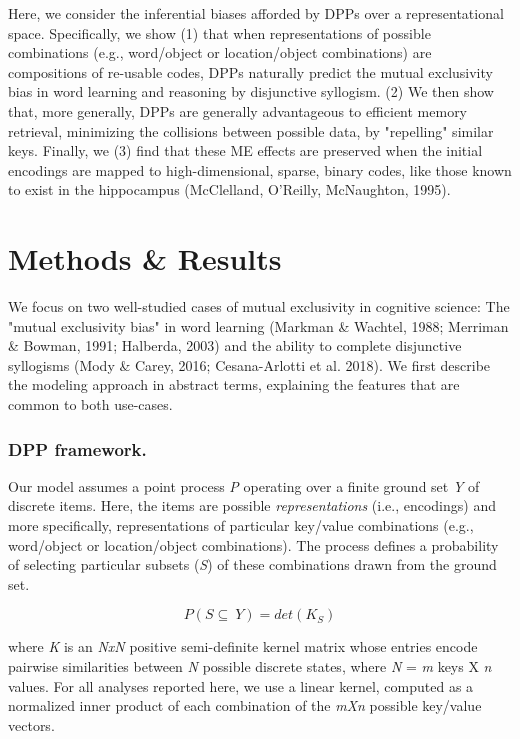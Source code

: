 \documentclass[10pt,letterpaper]{article}
\begin{document}
Here, we consider the inferential biases afforded by DPPs over a representational space. Specifically, we show (1) that when representations of possible combinations (e.g., word/object or location/object combinations) are compositions of re-usable codes, DPPs naturally predict the mutual exclusivity bias in word learning and reasoning by disjunctive syllogism. (2) We then show that, more generally, DPPs are generally advantageous to efficient memory retrieval, minimizing the collisions between possible data, by "repelling" similar keys. Finally, we (3) find that these ME effects are preserved when the initial encodings are mapped to high-dimensional, sparse, binary codes, like those known to exist in the hippocampus (McClelland, O'Reilly, McNaughton, 1995).

\section{Methods & Results}

We focus on two well-studied cases of mutual exclusivity in cognitive science: The "mutual exclusivity bias" in word learning (Markman & Wachtel, 1988; Merriman & Bowman, 1991; Halberda, 2003) and the ability to complete disjunctive syllogisms (Mody \& Carey, 2016; Cesana-Arlotti et al. 2018). We first describe the modeling approach in abstract terms, explaining the features that are common to both use-cases.

\subsubsection{DPP framework.}
Our model assumes a point process \textit{P} operating over a finite ground set \textit{Y} of discrete items. Here, the items are possible \textit{representations} (i.e., encodings) and more specifically, representations of particular key/value combinations (e.g., word/object or location/object combinations). The process defines a probability of selecting particular subsets (\textit{S}) of these combinations drawn from the ground set.

\[P (S \subseteq\ Y) = det (K _{S})\]

where \textit{K} is an \textit{NxN} positive semi-definite kernel matrix whose entries encode pairwise similarities between \textit{N} possible discrete states, where \textit{N} = \textit{m} keys X \textit{n} values. For all analyses reported here, we use a linear kernel, computed as a normalized inner product of each combination of the \textit{mXn} possible key/value vectors.
\end{document}
